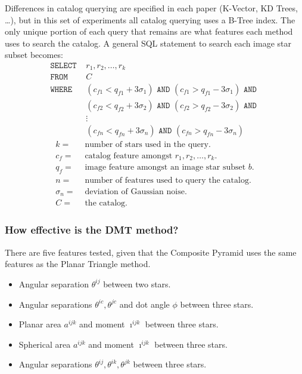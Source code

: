 Differences in catalog querying are specified in each paper (K-Vector, KD Trees, \ldots), but in this set of
experiments all catalog querying uses a B-Tree index.
The only unique portion of each query that remains are what features each method uses to search the catalog.
A general SQL statement to search each image star subset becomes:
\begin{align*}
    \texttt{SELECT } &r_1, r_2, \ldots, r_k \\
    \texttt{FROM } &C \\
    \texttt{WHERE } &(c_{f1} < q_{f1} + 3\sigma_1) \texttt{ AND } (c_{f1} > q_{f1} - 3\sigma_1) \texttt{ AND } \\
    &(c_{f2} < q_{f2} + 3\sigma_2) \texttt{ AND } (c_{f2} > q_{f2} - 3\sigma_2) \texttt{ AND } \\
    &\vdots \\
    &(c_{fn} < q_{fn} + 3\sigma_n) \texttt{ AND } (c_{fn} > q_{fn} - 3\sigma_n)
\end{align*}
\begin{align*}
    k =& \text{ number of stars used in the query.} \\
    c_f =& \text{ catalog feature amongst } r_1, r_2, \ldots, r_k.\\
    q_f =& \text{ image feature amongst an image star subset } b. \\
    n =& \text{ number of features used to query the catalog.} \\
    \sigma_n =& \text{ deviation of Gaussian noise.} \\
    C =& \text{ the catalog.}
\end{align*}\subsubsection{How effective is the DMT method?}

There are five features tested, given that the Composite Pyramid uses the same features as the Planar Triangle method.
\begin{itemize}
    \item Angular separation $\theta^{ij}$ between two stars.
    \item Angular separations $\theta^{ic}, \theta^{jc}$ and dot angle $\phi$ between three stars.
    \item Planar area $a^{ijk}$ and moment $\imath^{ijk}$ between three stars.
    \item Spherical area $a^{ijk}$ and moment $\imath^{ijk}$ between three stars.
    \item Angular separations $\theta^{ij}, \theta^{ik}, \theta^{jk}$ between three stars.
\end{itemize}

